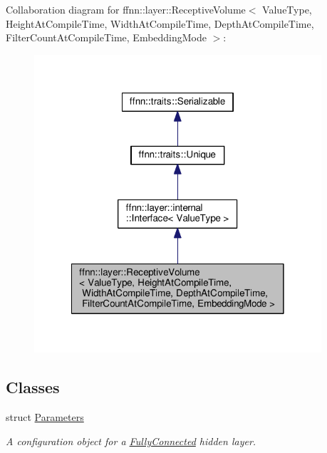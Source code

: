 Collaboration diagram for ffnn\-:\-:layer\-:\-:Receptive\-Volume$<$ Value\-Type, Height\-At\-Compile\-Time, Width\-At\-Compile\-Time, Depth\-At\-Compile\-Time, Filter\-Count\-At\-Compile\-Time, Embedding\-Mode $>$\-:
\nopagebreak
\begin{figure}[H]
\begin{center}
\leavevmode
\includegraphics[width=302pt]{classffnn_1_1layer_1_1_receptive_volume__coll__graph}
\end{center}
\end{figure}
\subsection*{Classes}
\begin{DoxyCompactItemize}
\item 
struct \hyperlink{structffnn_1_1layer_1_1_receptive_volume_1_1_parameters}{Parameters}
\begin{DoxyCompactList}\small\item\em A configuration object for a \hyperlink{classffnn_1_1layer_1_1_fully_connected}{Fully\-Connected} hidden layer. \end{DoxyCompactList}\end{DoxyCompactItemize}
